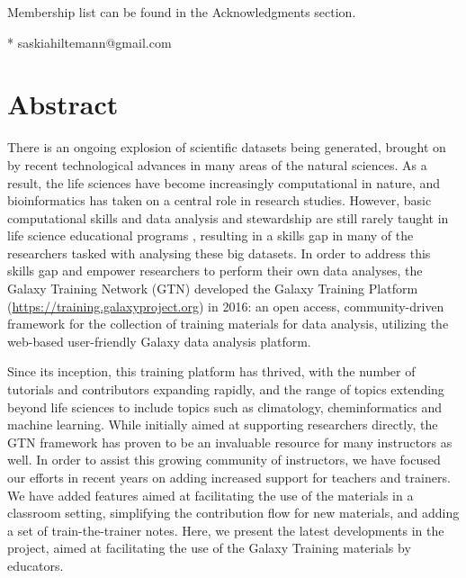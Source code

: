 \documentclass[10pt,letterpaper]{article}
\begin{document}
\begin{flushleft}


\textpilcrow Membership list can be found in the Acknowledgments section.

* saskiahiltemann@gmail.com

\end{flushleft}


\section*{Abstract}
There is an ongoing explosion of scientific datasets being generated, brought on by recent technological advances in many areas of the natural sciences.
As a result, the life sciences have become increasingly computational in nature, and bioinformatics has taken on a central role in research studies.
However, basic computational skills and data analysis and stewardship are still rarely taught in life science educational programs \cite{Attwood2019}, resulting in a skills gap in many of the researchers tasked with analysing these big datasets.
In order to address this skills gap and empower researchers to perform their own data analyses, the Galaxy Training Network (GTN) developed the Galaxy Training Platform (\url{https://training.galaxyproject.org}) in 2016: an open access, community-driven framework for the collection of training materials for data analysis, utilizing the web-based user-friendly Galaxy data analysis platform.

Since its inception, this training platform has thrived, with the number of tutorials and contributors expanding rapidly, and the range of topics extending beyond life sciences to include topics such as climatology, cheminformatics and machine learning.
While initially aimed at supporting researchers directly, the GTN framework has proven to be an invaluable resource for many instructors as well. In order to assist this growing community of instructors, we have focused our efforts in recent years on adding increased support for teachers and trainers.
We have added features aimed at facilitating the use of the materials in a classroom setting, simplifying the contribution flow for new materials, and adding a set of train-the-trainer notes.
Here, we present the latest developments in the project, aimed at facilitating the use of the Galaxy Training materials by educators.
\end{document}
